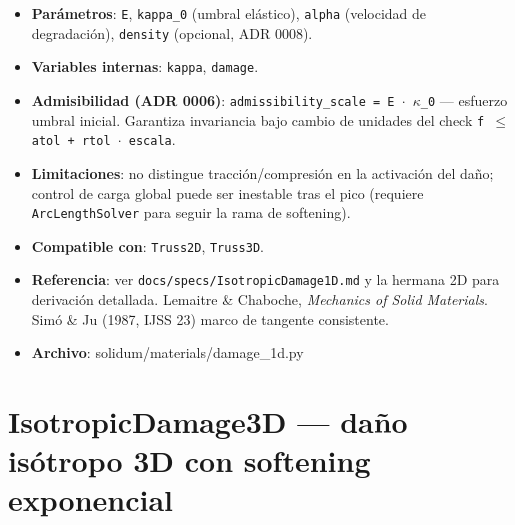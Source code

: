 \documentclass[11pt,letterpaper,oneside]{report}
\begin{document}
\begin{itemize}
  \item \textbf{Parámetros}: \texttt{E}, \texttt{kappa\_0} (umbral elástico), \texttt{alpha} (velocidad de degradación), \texttt{density} (opcional, ADR 0008).
  \item \textbf{Variables internas}: \texttt{kappa}, \texttt{damage}.
  \item \textbf{Admisibilidad (ADR 0006)}: \texttt{admissibility\_scale = E \ensuremath{\cdot} \ensuremath{\kappa}\_0} --- esfuerzo umbral inicial. Garantiza invariancia bajo cambio de unidades del check \texttt{f \ensuremath{\le} atol + rtol \ensuremath{\cdot} escala}.
  \item \textbf{Limitaciones}: no distingue tracción/compresión en la activación del daño; control de carga global puede ser inestable tras el pico (requiere \texttt{ArcLengthSolver} para seguir la rama de softening).
  \item \textbf{Compatible con}: \texttt{Truss2D}, \texttt{Truss3D}.
  \item \textbf{Referencia}: ver \texttt{docs/specs/IsotropicDamage1D.md} y la hermana 2D para derivación detallada. Lemaitre \& Chaboche, \textit{Mechanics of Solid Materials}. Simó \& Ju (1987, IJSS 23) marco de tangente consistente.
  \item \textbf{Archivo}: solidum/materials/damage\_1d.py
\end{itemize}


\section{IsotropicDamage3D --- daño isótropo 3D con softening exponencial}
\end{document}
